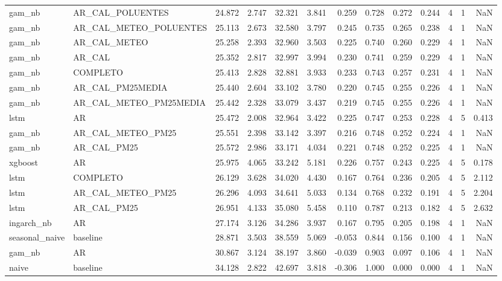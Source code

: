 \begin{tabular}{llrrrrrrrrrrr}
gam_nb & AR_CAL_POLUENTES & 24.872 & 2.747 & 32.321 & 3.841 & 0.259 & 0.728 & 0.272 & 0.244 & 4 & 1 & NaN \\
gam_nb & AR_CAL_METEO_POLUENTES & 25.113 & 2.673 & 32.580 & 3.797 & 0.245 & 0.735 & 0.265 & 0.238 & 4 & 1 & NaN \\
gam_nb & AR_CAL_METEO & 25.258 & 2.393 & 32.960 & 3.503 & 0.225 & 0.740 & 0.260 & 0.229 & 4 & 1 & NaN \\
gam_nb & AR_CAL & 25.352 & 2.817 & 32.997 & 3.994 & 0.230 & 0.741 & 0.259 & 0.229 & 4 & 1 & NaN \\
gam_nb & COMPLETO & 25.413 & 2.828 & 32.881 & 3.933 & 0.233 & 0.743 & 0.257 & 0.231 & 4 & 1 & NaN \\
gam_nb & AR_CAL_PM25MEDIA & 25.440 & 2.604 & 33.102 & 3.780 & 0.220 & 0.745 & 0.255 & 0.226 & 4 & 1 & NaN \\
gam_nb & AR_CAL_METEO_PM25MEDIA & 25.442 & 2.328 & 33.079 & 3.437 & 0.219 & 0.745 & 0.255 & 0.226 & 4 & 1 & NaN \\
lstm & AR & 25.472 & 2.008 & 32.964 & 3.422 & 0.225 & 0.747 & 0.253 & 0.228 & 4 & 5 & 0.413 \\
gam_nb & AR_CAL_METEO_PM25 & 25.551 & 2.398 & 33.142 & 3.397 & 0.216 & 0.748 & 0.252 & 0.224 & 4 & 1 & NaN \\
gam_nb & AR_CAL_PM25 & 25.572 & 2.986 & 33.171 & 4.034 & 0.221 & 0.748 & 0.252 & 0.225 & 4 & 1 & NaN \\
xgboost & AR & 25.975 & 4.065 & 33.242 & 5.181 & 0.226 & 0.757 & 0.243 & 0.225 & 4 & 5 & 0.178 \\
lstm & COMPLETO & 26.129 & 3.628 & 34.020 & 4.430 & 0.167 & 0.764 & 0.236 & 0.205 & 4 & 5 & 2.112 \\
lstm & AR_CAL_METEO_PM25 & 26.296 & 4.093 & 34.641 & 5.033 & 0.134 & 0.768 & 0.232 & 0.191 & 4 & 5 & 2.204 \\
lstm & AR_CAL_PM25 & 26.951 & 4.133 & 35.080 & 5.458 & 0.110 & 0.787 & 0.213 & 0.182 & 4 & 5 & 2.632 \\
ingarch_nb & AR & 27.174 & 3.126 & 34.286 & 3.937 & 0.167 & 0.795 & 0.205 & 0.198 & 4 & 1 & NaN \\
seasonal_naive & baseline & 28.871 & 3.503 & 38.559 & 5.069 & -0.053 & 0.844 & 0.156 & 0.100 & 4 & 1 & NaN \\
gam_nb & AR & 30.867 & 3.124 & 38.197 & 3.860 & -0.039 & 0.903 & 0.097 & 0.106 & 4 & 1 & NaN \\
naive & baseline & 34.128 & 2.822 & 42.697 & 3.818 & -0.306 & 1.000 & 0.000 & 0.000 & 4 & 1 & NaN \\
\bottomrule
\end{tabular}
